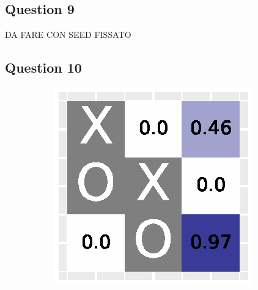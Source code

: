 \documentclass[10pt]{IEEEtran}
\begin{document}
\subsection*{Question 9}
DA FARE CON SEED FISSATO

\subsection*{Question 10}
\begin{figure}[H]
     \centering
     \begin{subfigure}[b]{0.32\linewidth}
         \centering
         \includegraphics[width=\linewidth]{code/figures/heatmap_0.eps}
         \caption{}
         \label{fig_heatmap_1}
     \end{subfigure}
     \hfill
     \begin{subfigure}[b]{0.32\linewidth}
         \centering

\end{subfigure}
\end{figure}
\end{document}
